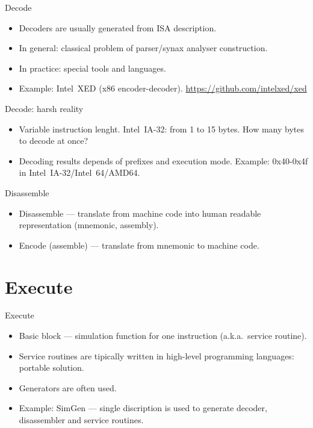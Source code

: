 \begin{frame}{Decode}
\begin{itemize}
\item Decoders are usually generated from ISA description.
\item In general: classical problem of parser/synax analyser construction.
\item In practice: special tools and languages.
\item Example: Intel\reg~XED (x86 encoder-decoder). \url{https://github.com/intelxed/xed}
\end{itemize}
\end{frame}

\begin{frame}{Decode: harsh reality}
\begin{itemize}
\item Variable instruction lenght. Intel\reg~IA-32: from 1 to 15 bytes. How many bytes to decode at once?
\item Decoding results depends of prefixes and execution mode. Example: 0x40-0x4f in Intel\reg~IA-32/Intel\reg~64/AMD64.
\end{itemize}
\end{frame}

\begin{frame}{Disassemble}
\begin{itemize}
\item Disassemble --- translate from machine code into human readable
  representation (mnemonic, assembly).
\item Encode (assemble) --- translate from mnemonic to machine code.
\end{itemize}
\end{frame}

\section{Execute}

\begin{frame}{Execute}
\begin{itemize}
\item Basic block --- simulation function for one instruction (a.k.a.~service routine).
\item Service routines are tipically written in high-level programming
  languages: portable solution.
\item Generators are often used.
\item Example: SimGen --- single discription is used to generate decoder,
  disassembler and service routines.
\end{itemize}
\end{frame}

